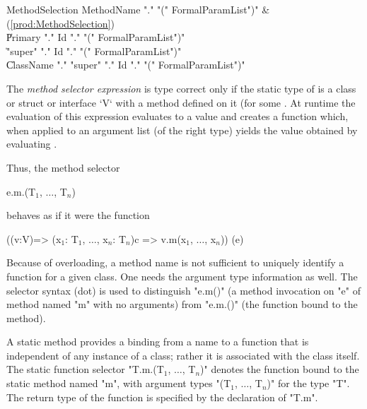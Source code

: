 \begin{bbgrammar}
     MethodSelection \: MethodName \xcd"." \xcd"(" FormalParamList\opt \xcd")" & (\ref{prod:MethodSelection}) \\
                    \| Primary \xcd"." Id \xcd"." \xcd"(" FormalParamList\opt \xcd")" \\
                    \| \xcd"super" \xcd"." Id \xcd"." \xcd"(" FormalParamList\opt \xcd")" \\
                    \| ClassName \xcd"." \xcd"super"  \xcd"." Id \xcd"." \xcd"(" FormalParamList\opt \xcd")" \\
\end{bbgrammar}

The \emph{method selector expression}  is type
correct only if  the static type of  is a
class or struct or interface \xcd`V` with a method
 defined on it (for some
. At runtime the evaluation of this expression
evaluates  to a value  and creates a function 
which, when applied to an argument list  (of the right
type) yields the value obtained by evaluating .

Thus, the method selector
\begin{xtenmath}
e.m.(T$_1$, $\dots$, T$_n$)
\end{xtenmath}
\noindent behaves as if it were the function
\begin{xtenmath}
((v:V)=>
  (x$_1$: T$_1$, $\dots$, x$_n$: T$_n$){c} 
  => v.m(x$_1$, $\dots$, x$_n$))
(e)
\end{xtenmath}



Because of overloading, a method name is not sufficient to
uniquely identify a function for a given class.
One needs the argument type information as well.
The selector syntax (dot) is used to distinguish \xcd"e.m()" (a
method invocation on \xcd"e" of method named \xcd"m" with no arguments)
from \xcd"e.m.()"
(the function bound to the method). 

A static method provides a binding from a name to a function that is
independent of any instance of a class; rather it is associated with the
class itself. The static function selector
\xcdmath"T.m.(T$_1$, $\dots$, T$_n$)" denotes the
function bound to the static method named \xcd"m", with argument types
\xcdmath"(T$_1$, $\dots$, T$_n$)" for the type \xcd"T". The return type
of the function is specified by the declaration of \xcd"T.m".

